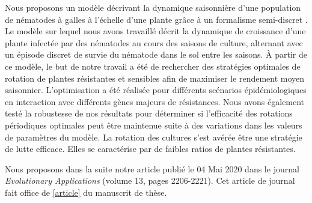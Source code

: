  Nous  proposons  un modèle décrivant la dynamique saisonnière d'une population de nématodes à galles à l'échelle d'une plante grâce à un formalisme semi-discret \citep{Mailleret2009}. Le modèle sur lequel nous avons travaillé décrit la dynamique de croissance d’une plante infectée par des nématodes au cours des saisons de culture, 
  alternant avec un épisode discret de survie du nématode dans le sol entre les saisons.
À partir de ce modèle, le but de notre travail a été de rechercher  des stratégies optimales de rotation de plantes résistantes et  sensibles afin de maximiser le rendement moyen saisonnier.
 L'optimisation a été réalisée  pour différents scénarios épidémiologiques en interaction avec différents gènes majeurs de résistances.  Nous avons également testé la robustesse de nos résultats pour
déterminer si l'efficacité des rotations périodiques optimales peut
être maintenue suite à des variations dans les valeurs de paramètres du modèle. 
La rotation des cultures s'est avérée être une stratégie de lutte efficace. Elles se caractérise par de faibles ratios de plantes résistantes.

 Nous proposons  dans la suite notre article publié le 04 Mai 2020 dans le journal  \textit{Evolutionary Applications} (volume 13, pages 2206-2221). Cet article de journal fait office de \autoref{article} du manuscrit de thèse.



%
%

\newpage



